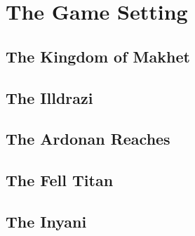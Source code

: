 \chapter{The Game Setting}

\begin{multicols}{2}

\section{The Kingdom of Makhet}

\section{The Illdrazi}

\section{The Ardonan Reaches}

\section{The Fell Titan}

\section{The Inyani}

\end{multicols}
